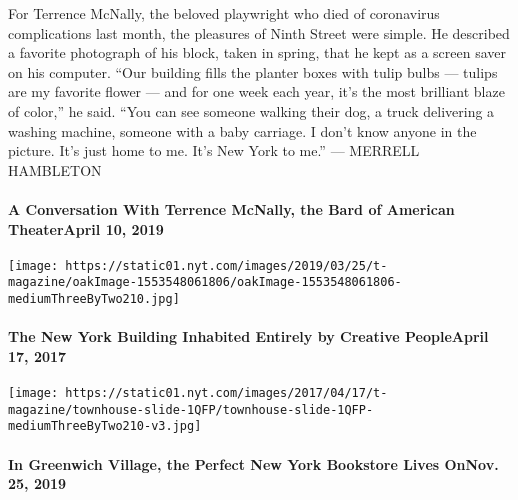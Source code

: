 For Terrence McNally, the beloved playwright who died of coronavirus
complications last month, the pleasures of Ninth Street were simple. He
described a favorite photograph of his block, taken in spring, that he
kept as a screen saver on his computer. ``Our building fills the planter
boxes with tulip bulbs --- tulips are my favorite flower --- and for one
week each year, it's the most brilliant blaze of color,'' he said. ``You
can see someone walking their dog, a truck delivering a washing machine,
someone with a baby carriage. I don't know anyone in the picture. It's
just home to me. It's New York to me.'' --- MERRELL HAMBLETON

\href{https://www.nytimes.com/interactive/2019/04/10/t-magazine/terrence-mcnally-interview.html}{}

\hypertarget{a-conversation-with-terrence-mcnally-the-bard-of-american-theaterapril-10-2019}{%
\paragraph{A Conversation With Terrence McNally, the Bard of American
TheaterApril 10,
2019}\label{a-conversation-with-terrence-mcnally-the-bard-of-american-theaterapril-10-2019}}

\texttt{[image: https://static01.nyt.com/images/2019/03/25/t-magazine/oakImage-1553548061806/oakImage-1553548061806-mediumThreeByTwo210.jpg]}
\href{https://www.nytimes.com/2017/04/17/t-magazine/greenwich-village-artists-townhouse.html}{}

\hypertarget{the-new-york-building-inhabited-entirely-by-creative-peopleapril-17-2017}{%
\paragraph{The New York Building Inhabited Entirely by Creative
PeopleApril 17,
2017}\label{the-new-york-building-inhabited-entirely-by-creative-peopleapril-17-2017}}

\texttt{[image: https://static01.nyt.com/images/2017/04/17/t-magazine/townhouse-slide-1QFP/townhouse-slide-1QFP-mediumThreeByTwo210-v3.jpg]}
\href{https://www.nytimes.com/2019/11/25/t-magazine/three-lives-bookstore.html}{}

\hypertarget{in-greenwich-village-the-perfect-new-york-bookstore-lives-onnov-25-2019}{%
\paragraph{In Greenwich Village, the Perfect New York Bookstore Lives
OnNov. 25,
2019}\label{in-greenwich-village-the-perfect-new-york-bookstore-lives-onnov-25-2019}}

